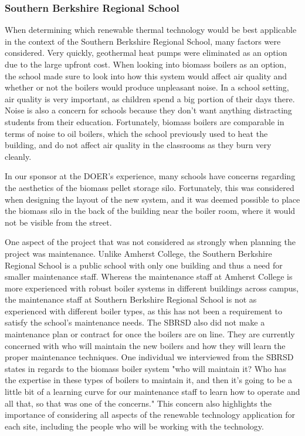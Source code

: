 \subsubsection{Southern Berkshire Regional School}
\par When determining which renewable thermal technology would be best applicable in the context of the Southern Berkshire Regional School, many factors were considered. Very quickly, geothermal heat pumps were eliminated as an option due to the large upfront cost. When looking into biomass boilers as an option, the school made sure to look into how this system would affect air quality and whether or not the boilers would produce unpleasant noise. In a school setting, air quality is very important, as children spend a big portion of their days there. Noise is also a concern for schools because they don’t want anything distracting students from their education. Fortunately, biomass boilers are comparable in terms of noise to oil boilers, which the school previously used to heat the building, and do not affect air quality in the classrooms as they burn very cleanly.
\par In our sponsor at the DOER’s experience, many schools have concerns regarding the aesthetics of the biomass pellet storage silo. Fortunately, this was considered when designing the layout of the new system, and it was deemed possible to place the biomass silo in the back of the building near the boiler room, where it would not be visible from the street.
\par One aspect of the project that was not considered as strongly when planning the project was maintenance. Unlike Amherst College, the Southern Berkshire Regional School is a public school with only one building and thus a need for smaller maintenance staff. Whereas the maintenance staff at Amherst College is more experienced with robust boiler systems in different buildings across campus, the maintenance staff at Southern Berkshire Regional School is not as experienced with different boiler types, as this has not been a requirement to satisfy the school’s maintenance needs. The SBRSD also did not make a maintenance plan or contract for once the boilers are on line. They are currently concerned with who will maintain the new boilers and how they will learn the proper maintenance techniques. One individual we interviewed from the SBRSD states in regards to the biomass boiler system "who will maintain it? Who has the expertise in these types of boilers to maintain it, and then it’s going to be a little bit of a learning curve for our maintenance staff to learn how to operate and all that, so that was one of the concerns." This concern also highlights the importance of considering all aspects of the renewable technology application for each site, including the people who will be working with the technology.

